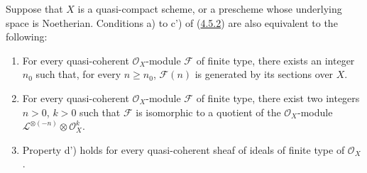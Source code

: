 \begin{proposition}[4.5.5]
\label{II.4.5.5}
Suppose that $X$ is a quasi-compact scheme, or a prescheme whose underlying
space is Noetherian. Conditions \textup{a)} to \textup{c')} of
\textup{(\hyperref[II.4.5.2]{4.5.2})} are also equivalent to the following:
\begin{enumerate}
  \item[\rm{d)}] For every quasi-coherent $\mathcal{O}_X$-module
  $\mathcal{F}$ of finite type, there exists an integer $n_0$ such that, for every
  $n\geq n_0$, $\mathcal{F}(n)$ is generated by its sections over
  $X$.
  \item[\rm{d')}] For every quasi-coherent $\mathcal{O}_X$-module
  $\mathcal{F}$ of finite type, there exist two integers $n>0$, $k>0$ such that
  $\mathcal{F}$ is isomorphic to a quotient of the $\mathcal{O}_X$-module
  $\mathcal{L}^{\otimes(-n)}\otimes\mathcal{O}_X^k$.
  \item[\rm{d'')}] Property \textup{d')} holds for every quasi-coherent sheaf of
  ideals of finite type of $\mathcal{O}_X$.
\end{enumerate}
\end{proposition}

